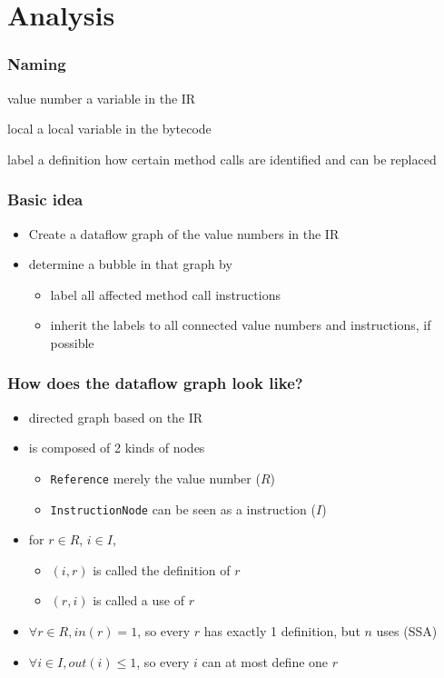 \documentclass{beamer}
\begin{document}
\section{Analysis}

\frame{\sectionpage}

\begin{frame}
   \frametitle{Naming}
   \begin{block}{value number}
	   a variable in the IR
   \end{block}

	\begin{block}{local}
		a local variable in the bytecode
	\end{block}

	\begin{block}{label}
    a definition how certain method calls are identified and can be replaced
	\end{block}

\end{frame}

\begin{frame}
  \frametitle{Basic idea}
  \begin{itemize}
      \item Create a dataflow graph of the value numbers in the IR
      \item determine a bubble in that graph by
      \begin{itemize}
        \item label all affected method call instructions
        \item inherit the labels to all connected value numbers and instructions, if possible
      \end{itemize}
  \end{itemize}
\end{frame}

\begin{frame}
  \frametitle{How does the dataflow graph look like?}
  \begin{itemize}
    \item directed graph based on the IR
    \item is composed of 2 kinds of nodes
      \begin{itemize}
        \item \texttt{Reference} merely the value number ($R$)
        \item \texttt{InstructionNode} can be seen as a instruction  ($I$)
      \end{itemize}
    \item for $r\in R$, $i \in I$, 
    \begin{itemize}
      \item $(i,r)$ is called the definition of $r$     
      \item $(r,i)$ is called a use of $r$
    \end{itemize}
    \item $\forall r \in R, in(r) = 1$, so every $r$ has exactly 1 definition, but $n$ uses (SSA)
    \item $\forall i \in I, out(i) \leq 1$, so every $i$ can at most define one $r$
  \end{itemize}
\end{frame}
\end{document}
